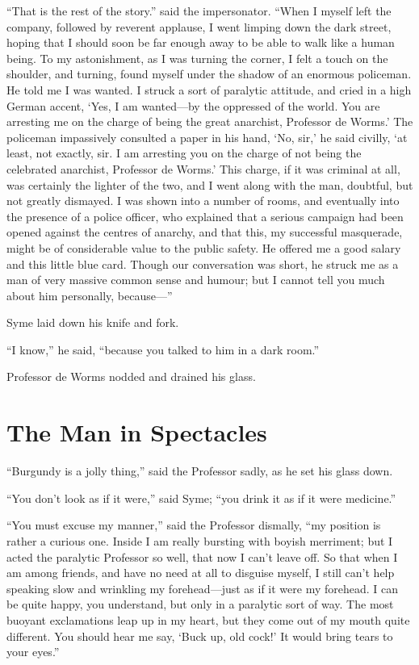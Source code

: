\documentclass{book}
\begin{document}
“That is the rest of the story.” said the impersonator. “When I myself left the company, followed by reverent applause, I went limping down the dark street, hoping that I should soon be far enough away to be able to walk like a human being. To my astonishment, as I was turning the corner, I felt a touch on the shoulder, and turning, found myself under the shadow of an enormous policeman. He told me I was wanted. I struck a sort of paralytic attitude, and cried in a high German accent, ‘Yes, I am wanted—by the oppressed of the world. You are arresting me on the charge of being the great anarchist, Professor de Worms.’ The policeman impassively consulted a paper in his hand, ‘No, sir,’ he said civilly, ‘at least, not exactly, sir. I am arresting you on the charge of not being the celebrated anarchist, Professor de Worms.’ This charge, if it was criminal at all, was certainly the lighter of the two, and I went along with the man, doubtful, but not greatly dismayed. I was shown into a number of rooms, and eventually into the presence of a police officer, who explained that a serious campaign had been opened against the centres of anarchy, and that this, my successful masquerade, might be of considerable value to the public safety. He offered me a good salary and this little blue card. Though our conversation was short, he struck me as a man of very massive common sense and humour; but I cannot tell you much about him personally, because—”

Syme laid down his knife and fork.

“I know,” he said, “because you talked to him in a dark room.”

Professor de Worms nodded and drained his glass.

\chapter{The Man in Spectacles}
\label{chapter-8}
“Burgundy is a jolly thing,” said the Professor sadly, as he set his glass down.

“You don’t look as if it were,” said Syme; “you drink it as if it were medicine.”

“You must excuse my manner,” said the Professor dismally, “my position is rather a curious one. Inside I am really bursting with boyish merriment; but I acted the paralytic Professor so well, that now I can’t leave off. So that when I am among friends, and have no need at all to disguise myself, I still can’t help speaking slow and wrinkling my forehead—just as if it were my forehead. I can be quite happy, you understand, but only in a paralytic sort of way. The most buoyant exclamations leap up in my heart, but they come out of my mouth quite different. You should hear me say, ‘Buck up, old cock!’ It would bring tears to your eyes.”
\end{document}
